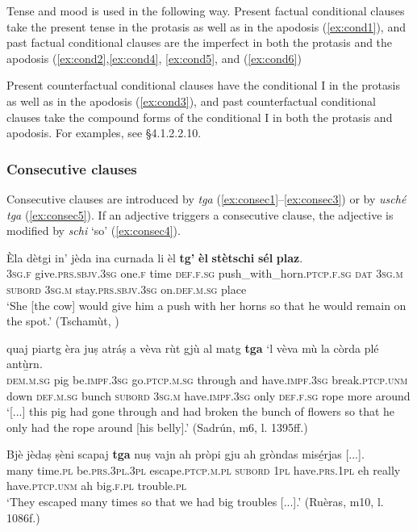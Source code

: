 Tense and mood is used in the following way. Present factual conditional clauses take the present tense in the protasis as well as in the apodosis (\ref{ex:cond1}), and past factual conditional clauses are the imperfect in both the protasis and the apodosis (\ref{ex:cond2},\ref{ex:cond4}, \ref{ex:cond5}, and (\ref{ex:cond6})

Present counterfactual conditional clauses have the conditional I in the protasis as well as in the apodosis (\ref{ex:cond3}), and past counterfactual conditional clauses take the compound forms of the conditional I in both the protasis and apodosis. For examples, see §4.1.2.2.10.

\subsubsection{Consecutive clauses}
Consecutive clauses are introduced by \textit{tga} (\ref{ex:consec1}--\ref{ex:consec3}) or by \textit{usché tga} (\ref{ex:consec5}). If an adjective triggers a consecutive clause, the adjective is modified by \textit{schi} `so' (\ref{ex:consec4}).

\ea
\label{ex:consec1}
\gll  Èla dètgi in' jèda ina curnada li èl \textbf{tg’} \textbf{èl} \textbf{stètschi} \textbf{sél} \textbf{plaz}.\\
\textsc{3sg.f} give.\textsc{prs.sbjv.3sg} one.\textsc{f} time \textsc{def.f.sg} push\_with\_horn.\textsc{ptcp.f.sg} \textsc{dat} \textsc{3sg.m} \textsc{subord} \textsc{3sg.m} stay.\textsc{prs.sbjv.3sg} on.\textsc{def.m.sg} place \\
\glt `She [the cow] would give him a push with her horns so that he would remain on the spot.' (Tschamùt, \citealt[20]{Büchli1966})
\z

\ea
\label{ex:consec2}
	\gll    [...] quaj piartg èra juṣ atráṣ a vèva rùt gjù al matg \textbf{tga} `l vèva mù la còrda plé antù̱rn.\\
{} \textsc{dem.m.sg} pig be.\textsc{impf.3sg} go.\textsc{ptcp.m.sg} through and have.\textsc{impf.3sg} break.\textsc{ptcp.unm} down \textsc{def.m.sg} bunch  \textsc{subord} \textsc{3sg.m} have.\textsc{impf.3sg} only \textsc{def.f.sg} rope more around\\
\glt `[...] this pig had gone through and had broken the bunch of flowers so that he only had the rope around [his belly].' (Sadrún, m6, l. 1395ff.)
\z

\ea
\label{ex:consec3}
\gll  Bjè jèdaṣ ṣèni scapaj \textbf{tga} nuṣ vajn ah pròpi gju ah gròndas misé̱rjas [...].\\
many time.\textsc{pl} be.\textsc{prs.3pl.3pl} escape.\textsc{ptcp.m.pl} \textsc{subord} \textsc{1pl}   have.\textsc{prs.1pl} eh really have.\textsc{ptcp.unm} ah big.\textsc{f.pl} trouble.\textsc{pl}\\
\glt `They escaped many times so that we had big troubles [...].' (Ruèras, m10, l. 1086f.)
\z

